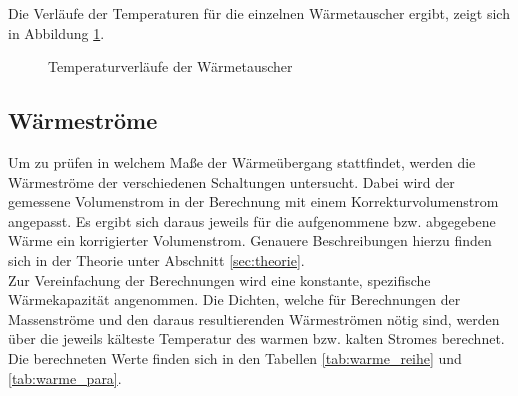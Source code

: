 Die Verläufe der Temperaturen für die einzelnen Wärmetauscher ergibt, zeigt sich in Abbildung \ref{dia:temp_profil}.

\vspace*{-7mm}

\begin{figure}[h!]
	\begin{center}
		\caption{Temperaturverläufe der Wärmetauscher}
		\label{dia:temp_profil}
	\end{center}
\end{figure}
\FloatBarrier

\subsection{Wärmeströme}
Um zu prüfen in welchem Maße der Wärmeübergang stattfindet, werden die Wärmeströme der verschiedenen Schaltungen untersucht. Dabei wird der gemessene Volumenstrom in der Berechnung mit einem Korrekturvolumenstrom angepasst. Es ergibt sich daraus jeweils für die aufgenommene bzw. abgegebene Wärme ein korrigierter Volumenstrom. Genauere Beschreibungen hierzu finden sich in der Theorie unter Abschnitt \ref{sec:theorie}.\\
Zur Vereinfachung der Berechnungen wird eine konstante, spezifische Wärmekapazität angenommen. Die Dichten, welche für Berechnungen der Massenströme und den daraus resultierenden Wärmeströmen nötig sind, werden über die jeweils kälteste Temperatur des warmen bzw. kalten Stromes berechnet.\\
Die berechneten Werte finden sich in den Tabellen \ref{tab:warme_reihe} und \ref{tab:warme_para}.

